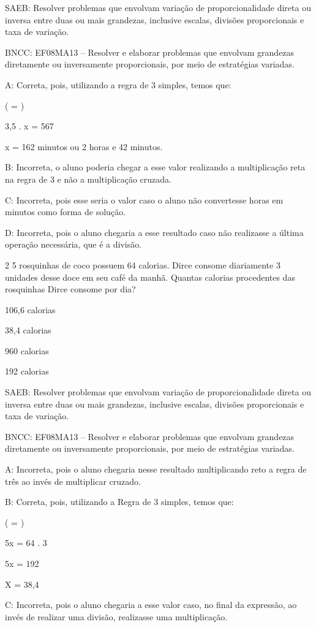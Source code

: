 {SAEB: Resolver problemas que envolvam variação de proporcionalidade
direta ou inversa entre duas ou mais grandezas, inclusive escalas,
divisões proporcionais e taxa de variação.

BNCC: EF08MA13 -- Resolver e elaborar problemas que envolvam grandezas
diretamente ou inversamente proporcionais, por meio de estratégias
variadas.

A: Correta, pois, utilizando a regra de 3 simples, temos que:

( = )

3,5 . x = 567

x = 162 minutos ou 2 horas e 42 minutos.

B: Incorreta, o aluno poderia chegar a esse valor realizando a
multiplicação reta na regra de 3 e não a multiplicação cruzada.

C: Incorreta, pois esse seria o valor caso o aluno não convertesse horas
em minutos como forma de solução.

D: Incorreta, pois o aluno chegaria a esse resultado caso não realizasse
a última operação necessária, que é a divisão.

\num{2} 5 rosquinhas de coco possuem 64 calorias. Dirce consome diariamente 3
unidades desse doce em seu café da manhã. Quantas calorias procedentes
das rosquinhas Dirce consome por dia?
\item 106,6 calorias
\item 38,4 calorias
\item 960 calorias
\item 192 calorias

SAEB: Resolver problemas que envolvam variação de proporcionalidade
direta ou inversa entre duas ou mais grandezas, inclusive escalas,
divisões proporcionais e taxa de variação.

BNCC: EF08MA13 -- Resolver e elaborar problemas que envolvam grandezas
diretamente ou inversamente proporcionais, por meio de estratégias
variadas.

A: Incorreta, pois o aluno chegaria nesse resultado multiplicando reto a
regra de três ao invés de multiplicar cruzado.

B: Correta, pois, utilizando a Regra de 3 simples, temos que:

( = )

5x = 64 . 3

5x = 192

X = 38,4

C: Incorreta, pois o aluno chegaria a esse valor caso, no final da
expressão, ao invés de realizar uma divisão, realizasse uma
multiplicação.

}
